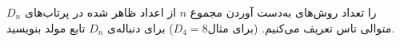     \p 
$D_n$
را تعداد روش‌های به‌دست آوردن مجموع
$n$
از اعداد ظاهر شده در پرتاب‌های متوالی تاس تعریف می‌کنیم. (برای مثال$D_4 = 8$)
برای دنباله‌ی
$D_n$
تابع مولد بنویسید.